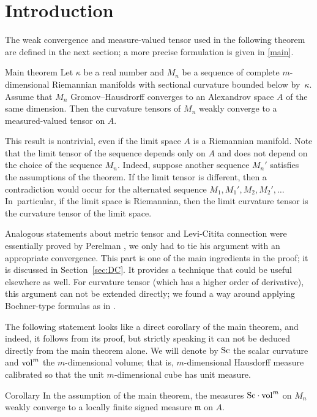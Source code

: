 \section{Introduction}

The weak convergence and measure-valued tensor used in the following theorem are defined in the next section;
a more precise formulation is given in \ref{main}.

\begin{thm}{Main theorem}
Let $\kappa$ be a real number and 
$M_n$ be a sequence of complete $m$-dimensional Riemannian manifolds with sectional curvature bounded below by~$\kappa$.
Assume that $M_n$ Gromov--Hausdrorff converges to an Alexandrov space $A$ of the same dimension.
Then the curvature tensors of $M_n$ weakly converge to a measured-valued tensor on $A$.
\end{thm}

This result is nontrivial, even if the limit space $A$ is a Riemannian manifold.
Note that the limit tensor of the sequence depends only on $A$ and does not depend on the choice of the sequence $M_n$.
Indeed, suppose another sequence $M_n'$ satisfies the assumptions of the theorem.
If the limit tensor is different, 
then a contradiction would occur for the alternated sequence $M_1,M_1',M_2,M_2',\dots$ 
In~particular, if the limit space is Riemannian, then the limit curvature tensor is the curvature tensor of the limit space.

Analogous statements about metric tensor and Levi-Citita connection were essentially proved by Perelman \cite{PerDC},
we only had to tie his argument with an appropriate convergence.
This part is one of the main ingredients in the proof;
it is discussed in Section~\ref{sec:DC}. 
It provides a technique that could be useful elsewhere as well.
For curvature tensor (which has a higher order of derivative), this argument can not be extended directly;
we found a way around applying Bochner-type formulas as in \cite{petrunin-SC}.

The following statement looks like a direct corollary of the main theorem, 
and indeed, it follows from its proof, but strictly speaking it can not be deduced directly from the main theorem alone.
We will denote by $\operatorname{\rm Sc}$ the scalar curvature and $\operatorname{vol}^m$ the $m$-dimensional volume; that is, $m$-dimensional Hausdorff measure calibrated so that the unit $m$-dimensional cube has unit measure.

\begin{thm}{Corollary}\label{cor:Sc}
In the assumption of the main theorem,
the measures $\Sc\cdot \vol^m$ on $M_n$ weakly converge to a locally finite signed measure $\mathfrak m$  on $A$.
\end{thm}


